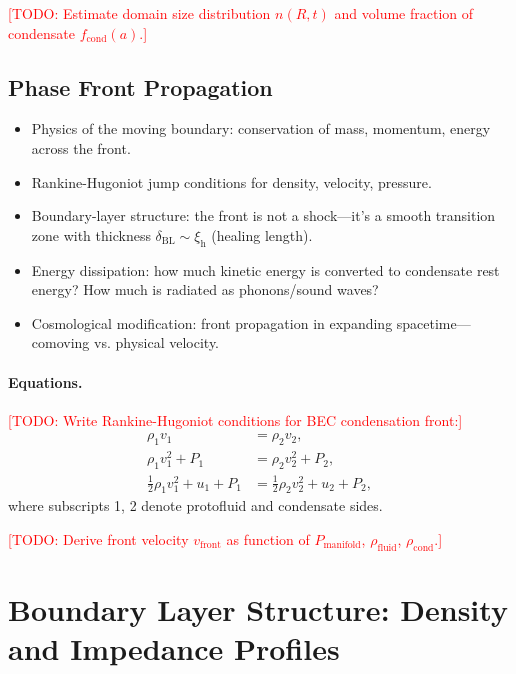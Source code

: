 \documentclass[11pt,a4paper]{article}
\newcommand{\rhofluid}{\ensuremath{\rho_{\mathrm{fluid}}}}
\newcommand{\rhocond}{\ensuremath{\rho_{\mathrm{cond}}}}
\newcommand{\Pmanifold}{\ensuremath{P_{\mathrm{manifold}}}}
\newcommand{\xih}{\ensuremath{\xi_{\mathrm{h}}}}
\newcommand{\deltaBL}{\ensuremath{\delta_{\mathrm{BL}}}}
\theoremstyle{definition}
\theoremstyle{remark}
\begin{document}
\textcolor{red}{[TODO: Estimate domain size distribution $n(R,t)$ and volume fraction of condensate $f_{\mathrm{cond}}(a)$.]}

\subsection{Phase Front Propagation}
\label{sec:front_propagation}

\begin{itemize}[leftmargin=*, itemsep=0.3em]
\item Physics of the moving boundary: conservation of mass, momentum, energy across the front.
\item Rankine-Hugoniot jump conditions for density, velocity, pressure.
\item Boundary-layer structure: the front is not a shock---it's a smooth transition zone with thickness $\deltaBL \sim \xih$ (healing length).
\item Energy dissipation: how much kinetic energy is converted to condensate rest energy? How much is radiated as phonons/sound waves?
\item Cosmological modification: front propagation in expanding spacetime---comoving vs. physical velocity.
\end{itemize}

\paragraph{Equations.}
\textcolor{red}{[TODO: Write Rankine-Hugoniot conditions for BEC condensation front:]}
\begin{align}
\rho_1 v_1 &= \rho_2 v_2, \label{eq:RH_mass} \\
\rho_1 v_1^2 + P_1 &= \rho_2 v_2^2 + P_2, \label{eq:RH_momentum} \\
\frac{1}{2}\rho_1 v_1^2 + u_1 + P_1 &= \frac{1}{2}\rho_2 v_2^2 + u_2 + P_2, \label{eq:RH_energy}
\end{align}
where subscripts 1, 2 denote protofluid and condensate sides.

\textcolor{red}{[TODO: Derive front velocity $v_{\mathrm{front}}$ as function of $\Pmanifold$, $\rhofluid$, $\rhocond$.]}

\section{Boundary Layer Structure: Density and Impedance Profiles}
\label{sec:boundary_layer}
\end{document}
